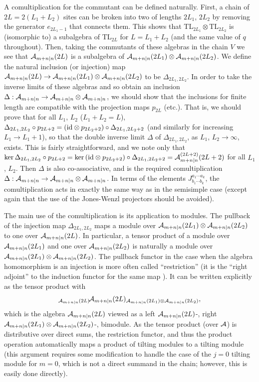 \documentclass[twocolumn,floats,pra]{revtex4}
\def \cA {{\cal A}}
\newcommand {\be}{\begin{equation}}
\newcommand {\ee} {\end{equation}}
\begin{document}
A comultiplication for the commutant can be defined naturally.
First, a chain of $2L=2(L_1+L_2)$ sites can be broken into two of
lengths $2L_1$, $2L_2$ by removing the generator $e_{2L_1-1}$ that
connects them. This shows that TL$_{2L_1}\otimes$TL$_{2L_2}$ is
(isomorphic to) a subalgebra of TL$_{2L}$ for $L=L_1+L_2$ (and the
same value of $q$ throughout). Then, taking the commutants of
these algebras in the chain $V$ we see that $\cA_{m+n|n}(2L)$ is a
subalgebra of $\cA_{m+n|n}(2L_1)\otimes \cA_{m+n|n}(2L_2)$. We
define the natural inclusion (or injection) map
$\cA_{m+n|n}(2L)\to \cA_{m+n|n}(2L_1)\otimes \cA_{m+n|n}(2L_2)$ to
be $\Delta_{2L_1,2L_2}$. In order to take the inverse limits of
these algebras and so obtain an inclusion  $\Delta:\cA_{m+n|n}\to
\cA_{m+n|n}\otimes \cA_{m+n|n}$, we should show that the
inclusions for finite length are compatible with the projection
maps $p_{2L}$ (etc.).  That is, we should prove that for all
$L_1$, $L_2$ ($L_1+L_2=L$), $\Delta_{2L_1,2L_2}\circ
p_{2L+2}=({\rm id}\otimes p_{2L_2+2})\circ \Delta_{2L_1,2L_2+2}$
(and similarly for increasing $L_1\to L_1+1$), so that the double
inverse limit $\Delta$ of $\Delta_{2L_1,2L_2}$, as $L_1$,
$L_2\to\infty$, exists. This is fairly straightforward, and we
note only that ${\rm ker}\, \Delta_{2L_1,2L_2}\circ p_{2L+2}={\rm
ker}\,({\rm id}\otimes p_{2L_2+2})\circ
\Delta_{2L_1,2L_2+2}=\cA^{(2L+2)}_{m+n|n}(2L+2)$ for all $L_1$,
$L_2$. Then $\Delta$ is also co-associative, and is the required
comultiplication $\Delta:\cA_{m+n|n}\to \cA_{m+n|n}\otimes
\cA_{m+n|n}$. In terms of the elements $J^{a_1\cdots
a_k}_{b_1\cdots b_k}$, the comultiplication acts in exactly the
same way as in the semisimple case (except again that the use of
the Jones-Wenzl projectors should be avoided).

The main use of the comultiplication is its application to
modules. The pullback of the injection map $\Delta_{2L_1,2L_2}$
maps a module over $\cA_{m+n|n}(2L_1)\otimes \cA_{m+n|n}(2L_2)$ to
one over $\cA_{m+n|n}(2L)$. In particular, a tensor product of a
module over $\cA_{m+n|n}(2L_1)$ and one over $\cA_{m+n|n}(2L_2)$
is naturally a module over $\cA_{m+n|n}(2L_1)\otimes
\cA_{m+n|n}(2L_2)$. The pullback functor in the case when the
algebra homomorphism is an injection is more often called
``restriction'' (it is the ``right adjoint'' to the induction
functor for the same map \cite{anf}). It can be written explicitly
as the tensor product with%
\be%
_{\cA_{m+n|n}(2L)}\!\cA_{m+n|n}(2L)_{\cA_{m+n|n}(2L_1)\otimes
\cA_{m+n|n}(2L_2)},\ee%
which is the algebra $\cA_{m+n|n}(2L)$ viewed as a left
$\cA_{m+n|n}(2L)$-, right $\cA_{m+n|n}(2L_1)\otimes
\cA_{m+n|n}(2L_2)$-, bimodule. As the tensor product (over $\cA$)
is distributive over direct sums, the restriction functor, and
thus the product operation automatically maps a product of tilting
modules to a tilting module (this argument requires some
modification to handle the case of the $j=0$ tilting module for
$m=0$, which is not a direct summand in the chain; however, this
is easily done directly).
\end{document}
